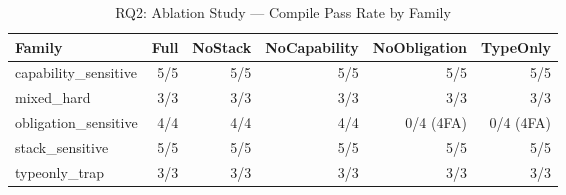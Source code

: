 \begin{table}[t]
\centering
\caption{RQ2: Ablation Study — Compile Pass Rate by Family}
\label{tab:rq2_ablation}
\begin{tabular}{lrrrrr}
\toprule
Family & Full & No\-Stack & No\-Capability & No\-Obligation & TypeOnly \\
\midrule
capability\_sensitive & 5/5 & 5/5 & 5/5 & 5/5 & 5/5 \\
mixed\_hard & 3/3 & 3/3 & 3/3 & 3/3 & 3/3 \\
obligation\_sensitive & 4/4 & 4/4 & 4/4 & 0/4 (4FA) & 0/4 (4FA) \\
stack\_sensitive & 5/5 & 5/5 & 5/5 & 5/5 & 5/5 \\
typeonly\_trap & 3/3 & 3/3 & 3/3 & 3/3 & 3/3 \\
\bottomrule
\end{tabular}
\end{table}
